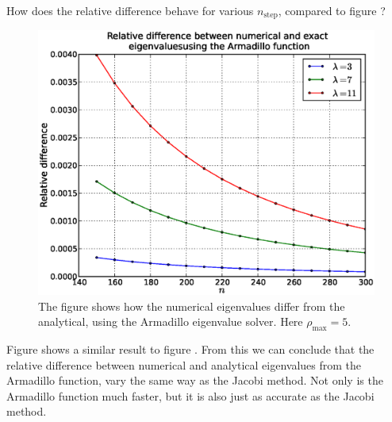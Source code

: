 How does the relative
difference behave for various $n_{\mathrm{step}}$, compared to figure ? 
%
\begin{figure}[htpb]
	\centering
	\includegraphics[width=1.0\textwidth]{images/armareldiff2.eps}
	\caption{The figure shows how the numerical eigenvalues differ from the analytical,
		using the Armadillo eigenvalue solver. Here $\rho_{\mathrm{max}} = 5$.}
	\label{fig:armareldiff}
\end{figure}
%
Figure  shows a similar result to figure . From this we
can conclude that the relative difference between numerical and analytical eigenvalues
from the Armadillo function, vary the same way as the Jacobi method. Not only is the
Armadillo function much faster, but it is also just as accurate as the Jacobi method.

